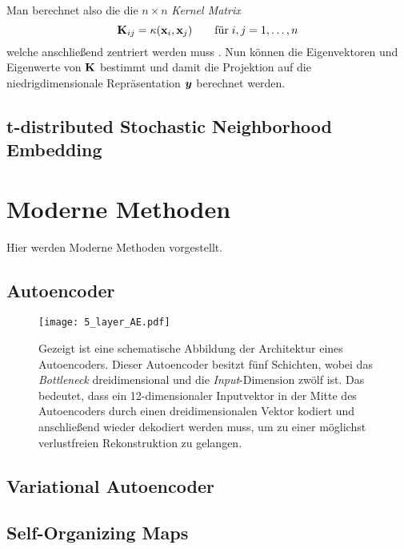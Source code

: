 Man berechnet also die die $n \times n$ \textit{Kernel Matrix}
\begin{equation}
	\mathbf{K}_{ij} = \kappa(\mathbf{x}_i, \mathbf{x}_j) \qquad \text{für}\; i,j = 1,\ldots,n
\end{equation}
welche anschließend zentriert werden muss \parencite[598]{Bishop.2006}.
Nun können die Eigenvektoren und Eigenwerte von $\mathbf{K}$ bestimmt und damit die Projektion auf die niedrigdimensionale Repräsentation $\bm{y}$ berechnet werden.







\subsection{t-distributed Stochastic Neighborhood Embedding}
\label{ch:MethodenDerDimRed:traditionell:t-SNE}

\newpage

\section{Moderne Methoden}
\label{ch:MethodenDerDimRed:modern}
Hier werden Moderne Methoden vorgestellt.

\subsection{Autoencoder}
\label{ch:MethodenDerDimRed:modern:AE}

\begin{figure}[h]
	\label{fig:5-layer-Autoencoder}
	\begin{center}
		\texttt{[image: 5\_layer\_AE.pdf]}
		\caption[Schematische Abbildung der Architektur eines Autoencoders]{Gezeigt ist eine schematische Abbildung der Architektur eines Autoencoders. Dieser Autoencoder besitzt fünf Schichten, wobei das \textit{Bottleneck} dreidimensional und die \textit{Input}-Dimension zwölf ist. Das bedeutet, dass ein 12-dimensionaler Inputvektor in der Mitte des Autoencoders durch einen dreidimensionalen Vektor kodiert und anschließend wieder dekodiert werden muss, um zu einer möglichst verlustfreien Rekonstruktion zu gelangen.}
	\end{center}
\end{figure}

\subsection{Variational Autoencoder}
\label{ch:MethodenDerDimRed:modern:VAE}

\subsection{Self-Organizing Maps}
\label{ch:MethodenDerDimRed:modern:SOM}
